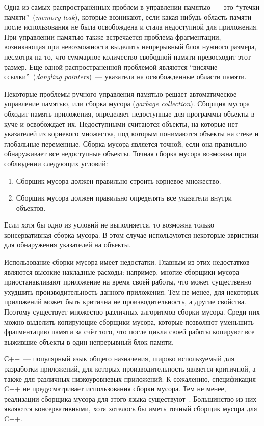 Одна из самых распространённых проблем в управлении памятью~--- это ``утечки памяти''~(\textit{memory leak}), 
которые возникают, если какая-нибудь область памяти после использования не была
освобождена и стала недоступной для приложения. При управлении памятью также встречается проблема фрагментации, возникающая при невозможности выделить непрерывный блок нужного размера,
несмотря на то, что суммарное количество свободной памяти превосходит этот размер. 
Еще одной распространенной проблемой являются ``висячие ссылки''~(\textit{dangling pointers})~--- указатели на освобожденные области памяти.

Некоторые проблемы ручного управления памятью решает автоматическое управление памятью, или сборка мусора (\textit{garbage collection}). 
Сборщик мусора обходит память приложения, определяет недоступные для программы
объекты в куче и освобождает их. Недоступными считаются объекты, на которые нет указателей из корневого множества, под которым понимаются объекты на стеке и глобальные переменные. Сборка мусора является точной, если она правильно обнаруживает все недоступные объекты. Точная сборка мусора возможна при соблюдении следующих условий:
\begin{enumerate}
\item{Сборщик мусора должен правильно строить корневое множество.}
\item{Сборщик мусора должен правильно определять все указатели внутри объектов.}
\end{enumerate}
Если хотя бы одно из условий не выполняется, то возможна только консервативная сборка мусора. В этом случае используются некоторые эвристики для 
обнаружения указателей на объекты.

Использование сборки мусора имеет недостатки. Главным из этих недостатков являются
высокие накладные расходы: например, многие сборщики мусора приостанавливают приложение
на время своей работы, что может существенно ухудшить производительность данного приложения. Тем не менее, для некоторых приложений может быть критична не производительность, а другие свойства. Поэтому
существует множество различных алгоритмов сборки мусора. Среди них можно выделить копирующие сборщики мусора, которые позволяют уменьшить фрагментацию памяти за счёт того, что после цикла своей работы копируют все выжившие объекты в один непрерывный блок памяти.

С++~--- популярный язык общего назначения, широко используемый
для разработки приложений, для которых производительность является критичной, а 
также для различных низкоуровневых приложений. К сожалению, спецификация C++ не предусматривает использования сборки мусора. Тем не менее, реализации сборщика мусора
для этого языка существуют~\cite{mcc1, boehm1}. Большинство из них являются консервативными, хотя хотелось 
бы иметь точный сборщик мусора для C++.

